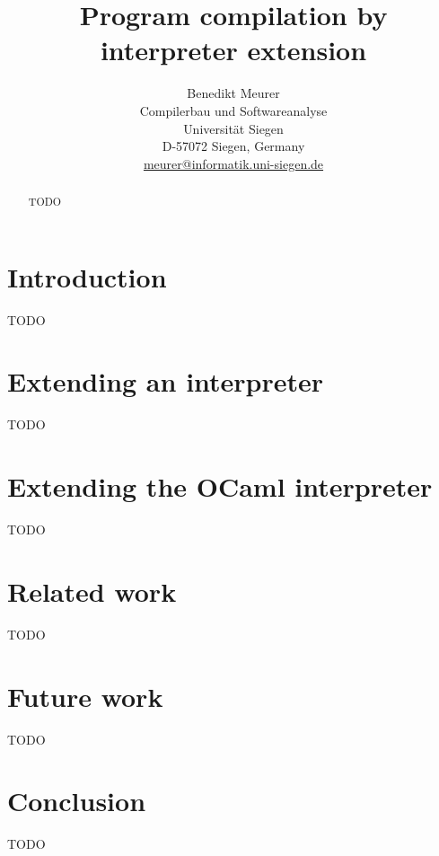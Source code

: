 \documentclass[12pt,a4paper,final]{article}
\begin{document}
\title{%
  Program compilation by interpreter extension
}
\author{%
  Benedikt Meurer\\
  Compilerbau und Softwareanalyse\\
  Universit\"at Siegen\\
  D-57072 Siegen, Germany\\
  \url{meurer@informatik.uni-siegen.de}
}
\date{}
\maketitle
\begin{abstract}
  TODO
\end{abstract}


\section{Introduction} \label{section:Introduction}

TODO


\section{Extending an interpreter}

TODO


\section{Extending the OCaml interpreter}

TODO


\section{Related work} \label{section:Related_work}

TODO


\section{Future work} \label{section:Future_work}

TODO


\section{Conclusion} \label{section:Conclusion}

TODO







\end{document}
